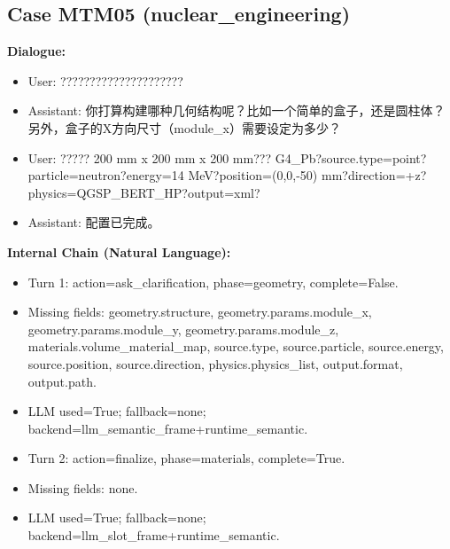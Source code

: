 \documentclass[11pt]{ctexart}
\begin{document}
\subsection{Case MTM05 (nuclear\_engineering)}
\textbf{Dialogue:}
\begin{itemize}
\item User: ?????????????????????
\item Assistant: 你打算构建哪种几何结构呢？比如一个简单的盒子，还是圆柱体？另外，盒子的X方向尺寸（module\_x）需要设定为多少？
\item User: ????? 200 mm x 200 mm x 200 mm??? G4\_Pb?source.type=point?particle=neutron?energy=14 MeV?position=(0,0,-50) mm?direction=+z?physics=QGSP\_BERT\_HP?output=xml?
\item Assistant: 配置已完成。
\end{itemize}
\textbf{Internal Chain (Natural Language):}
\begin{itemize}
\item Turn 1: action=ask\_clarification, phase=geometry, complete=False.
\item Missing fields: geometry.structure, geometry.params.module\_x, geometry.params.module\_y, geometry.params.module\_z, materials.volume\_material\_map, source.type, source.particle, source.energy, source.position, source.direction, physics.physics\_list, output.format, output.path.
\item LLM used=True; fallback=none; backend=llm\_semantic\_frame+runtime\_semantic.
\item Turn 2: action=finalize, phase=materials, complete=True.
\item Missing fields: none.
\item LLM used=True; fallback=none; backend=llm\_slot\_frame+runtime\_semantic.
\end{itemize}
\end{document}

